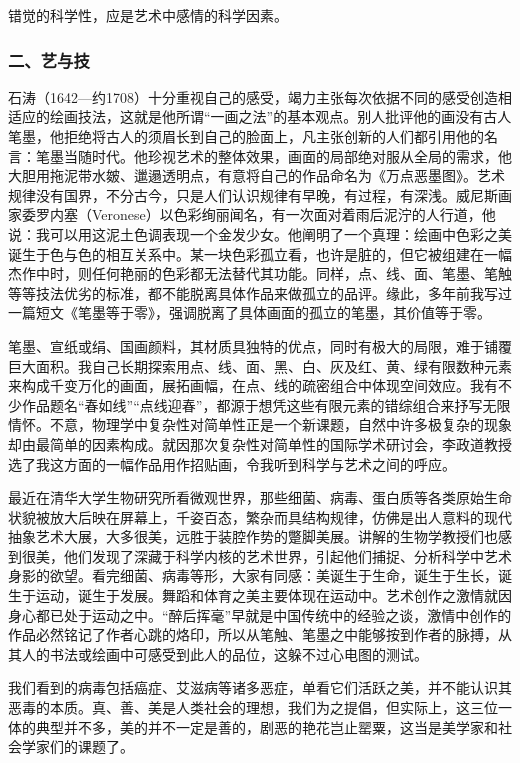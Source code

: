 \documentclass{article}
\begin{document}
错觉的科学性，应是艺术中感情的科学因素。
\subsubsection{二、艺与技}
石涛（1642—约1708）十分重视自己的感受，竭力主张每次依据不同的感受创造相适应的绘画技法，这就是他所谓“一画之法”的基本观点。别人批评他的画没有古人笔墨，他拒绝将古人的须眉长到自己的脸面上，凡主张创新的人们都引用他的名言：笔墨当随时代。他珍视艺术的整体效果，画面的局部绝对服从全局的需求，他大胆用拖泥带水皴、邋遢透明点，有意将自己的作品命名为《万点恶墨图》。艺术规律没有国界，不分古今，只是人们认识规律有早晚，有过程，有深浅。威尼斯画家委罗内塞（Veronese）以色彩绚丽闻名，有一次面对着雨后泥泞的人行道，他说：我可以用这泥土色调表现一个金发少女。他阐明了一个真理：绘画中色彩之美诞生于色与色的相互关系中。某一块色彩孤立看，也许是脏的，但它被组建在一幅杰作中时，则任何艳丽的色彩都无法替代其功能。同样，点、线、面、笔墨、笔触等等技法优劣的标准，都不能脱离具体作品来做孤立的品评。缘此，多年前我写过一篇短文《笔墨等于零》，强调脱离了具体画面的孤立的笔墨，其价值等于零。

笔墨、宣纸或绢、国画颜料，其材质具独特的优点，同时有极大的局限，难于铺覆巨大面积。我自己长期探索用点、线、面、黑、白、灰及红、黄、绿有限数种元素来构成千变万化的画面，展拓画幅，在点、线的疏密组合中体现空间效应。我有不少作品题名“春如线”“点线迎春”，都源于想凭这些有限元素的错综组合来抒写无限情怀。不意，物理学中复杂性对简单性正是一个新课题，自然中许多极复杂的现象却由最简单的因素构成。就因那次复杂性对简单性的国际学术研讨会，李政道教授选了我这方面的一幅作品用作招贴画，令我听到科学与艺术之间的呼应。

最近在清华大学生物研究所看微观世界，那些细菌、病毒、蛋白质等各类原始生命状貌被放大后映在屏幕上，千姿百态，繁杂而具结构规律，仿佛是出人意料的现代抽象艺术大展，大多很美，远胜于装腔作势的蹩脚美展。讲解的生物学教授们也感到很美，他们发现了深藏于科学内核的艺术世界，引起他们捕捉、分析科学中艺术身影的欲望。看完细菌、病毒等形，大家有同感：美诞生于生命，诞生于生长，诞生于运动，诞生于发展。舞蹈和体育之美主要体现在运动中。艺术创作之激情就因身心都已处于运动之中。“醉后挥毫”早就是中国传统中的经验之谈，激情中创作的作品必然铭记了作者心跳的烙印，所以从笔触、笔墨之中能够按到作者的脉搏，从其人的书法或绘画中可感受到此人的品位，这躲不过心电图的测试。

我们看到的病毒包括癌症、艾滋病等诸多恶症，单看它们活跃之美，并不能认识其恶毒的本质。真、善、美是人类社会的理想，我们为之提倡，但实际上，这三位一体的典型并不多，美的并不一定是善的，剧恶的艳花岂止罂粟，这当是美学家和社会学家们的课题了。
\end{document}
